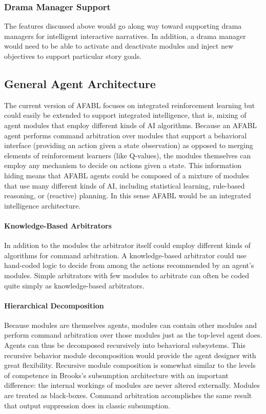 \subsubsection{Drama Manager Support}

The features discussed above would go along way toward supporting drama managers for intelligent interactive narratives. In addition, a drama manager would need to be able to activate and deactivate modules and inject new objectives to support particular story goals.

\subsection{General Agent Architecture}

The current version of AFABL focuses on integrated reinforcement learning but could easily be extended to support integrated intelligence, that is, mixing of agent modules that employ different kinds of AI algorithms. Because an AFABL agent performs command arbitration over modules that support a behavioral interface (providing an action given a state observation) as opposed to merging elements of reinforcement learners (like Q-values), the modules themselves can employ any mechanism to decide on actions given a state.  This information hiding means that AFABL agents could be composed of a mixture of modules that use many different kinds of AI, including statistical learning, rule-based reasoning, or (reactive) planning.  In this sense AFABL would be an integrated intelligence architecture.

\paragraph{Knowledge-Based Arbitrators}

In addition to the modules the arbitrator itself could employ different kinds of algorithms for command arbitration. A knowledge-based arbitrator could use hand-coded logic to decide from among the actions recommended by an agent's modules.  Simple arbitrators with few modules to arbitrate can often be coded quite simply as knowledge-based arbitrators.

\paragraph{Hierarchical Decomposition}

Because modules are themselves agents, modules can contain other modules and perform command arbitration over those modules just as the top-level agent does.  Agents can thus be decomposed recursively into behavioral subsystems.  This recursive behavior module decomposition would provide the agent designer with great flexibility.  Recursive module composition is somewhat similar to the levels of competence in Brooks's subsumption architecture with an important difference: the internal workings of modules are never altered externally.  Modules are treated as black-boxes.  Command arbitration accomplishes the same result that output suppression does in classic subsumption.

